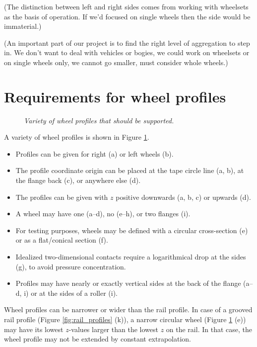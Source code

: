 \documentclass[12pt]{report}
\begin{document}
{(The distinction between left and right sides comes from working with
wheelsets as the basis of operation. If we'd focused on single wheels then
the side would be immaterial.)

(An important part of our project is to find the right level of
aggregation to step in. We don't want to deal with vehicles or bogies, we
could work on wheelsets or on single wheels only, we cannot go smaller,
must consider whole wheels.)

\section{Requirements for wheel profiles}

\begin{figure}[bt]
\centering
{}
\caption{\em Variety of wheel profiles that should be supported.}
\label{fig:wheel_profiles}
\end{figure}

A variety of wheel profiles is shown in Figure \ref{fig:wheel_profiles}.
\begin{itemize}
\item Profiles can be given for right (a) or left wheels (b).
\item The profile coordinate origin can be placed at the tape circle line
        (a, b), at the flange back (c), or anywhere else (d).
\item The profiles can be given with $z$ positive downwards (a, b, c) or
        upwards (d).
\item A wheel may have one (a--d), no (e--h), or two flanges (i).
\item For testing purposes, wheels may be defined with a circular
        cross-section (e) or as a flat/conical section (f).
\item Idealized two-dimensional contacts require a logarithmical drop at
        the sides (g), to avoid pressure concentration.
\item Profiles may have nearly or exactly vertical sides at the back of
        the flange (a--d, i) or at the sides of a roller (i).
\end{itemize}
Wheel profiles can be narrower or wider than the rail profile. In case of a
grooved rail profile (Figure \ref{fig:rail_profiles} (k)), a narrow
circular wheel (Figure \ref{fig:wheel_profiles} (e)) may have its lowest
$z$-values larger than the lowest $z$ on the rail. In that case, the wheel
profile may not be extended by constant extrapolation.
}
\end{document}
